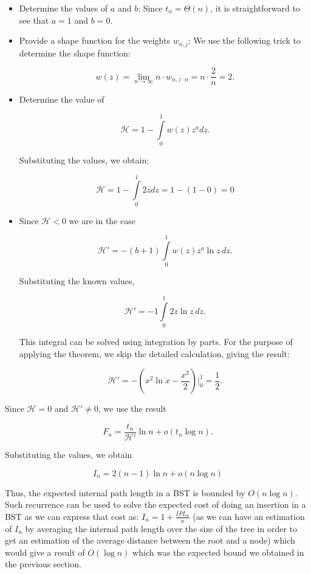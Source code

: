 \begin{itemize}
    \item Determine the values of \( a \) and \( b \): Since \( t_n = \Theta(n) \), it is straightforward to see that $a = 1$ and $b = 0$.
    \item Provide a shape function for the weights \( w_{n,j} \): We use the following trick to determine the shape function:

    \[
    w(z) = \lim\limits_{n\to\infty} n \cdot w_{n,z\cdot n} = n \cdot \frac{2}{n} = 2.
    \]

    \item Determine the value of 

    \[
    \mathcal{H} = 1 - \int\limits_{0}^{1} w(z) z^a dz.
    \]

    Substituting the values, we obtain:

    \[
    \mathcal{H} = 1 - \int\limits_{0}^{1} 2z dz = 1 - (1 - 0) = 0
    \]

    \item Since \( \mathcal{H} < 0 \) we are in the case

    \[
    \mathcal{H'} = -(b+1) \int\limits_{0}^{1} w(z) z^a \ln z \, dz.
    \]

    Substituting the known values,

    \[
    \mathcal{H'} = -1 \int\limits_{0}^{1} 2z \ln z \, dz.
    \]

    This integral can be solved using integration by parts. For the purpose of applying the theorem, we skip the detailed calculation, giving the result:

    \[
    \mathcal{H'} = - (x^2 \ln x - \frac{x^2}{2})\Big|_0^1 = \frac{1}{2}.
    \]

\end{itemize}

Since \( \mathcal{H} = 0 \) and \( \mathcal{H'} \neq 0 \), we use the result

\[
F_n = \frac{t_n}{\mathcal{H'}} \ln n + o(t_n \log n).
\]

Substituting the values, we obtain

\[
I_n = 2(n-1) \ln n + o(n \log n)
\]

Thus, the expected internal path length in a BST is bounded by \( O(n \log n) \). Such recurrence can be used to solve the expected cost of doing an insertion in a BST as we can express that cost as: $I_n = 1 + \frac{IPL_n}{n}$ (as we can have an estimation of $I_n$ by averaging the internal path length over the size of the tree in order to get an estimation of the average distance between the root and a node) which would give a result of $O(\log n)$ which was the expected bound we obtained in the previous section.

